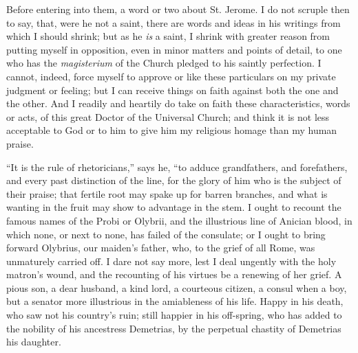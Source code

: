 Before entering into them, a word or two about St. Jerome. I do not
scruple then to say, that, were he not a saint, there are words and
ideas in his writings from which I should shrink; but as he \emph{is}
a saint, I shrink with greater reason from putting myself in
opposition, even in minor matters and points of detail, to one who has
the \emph{magisterium} of the Church pledged to his saintly
perfection. I cannot, indeed, force myself to approve or like these
particulars on my private judgment or feeling; but I can receive
things on faith against both the one and the other. And I readily and
heartily do take on faith these characteristics, words or acts, of
this great Doctor of the Universal Church; and think it is not less
acceptable to God or to him to give him my religious homage than my
human praise.

``It is the rule of rhetoricians,'' says he, ``to
adduce grandfathers, and forefathers, and every past distinction of
the line, for the glory of him who is the subject of their praise;
that fertile root may spake up for barren branches, and what is
wanting in the fruit may show to advantage
in the stem. I ought to recount the famous names of the Probi or
Olybrii, and the illustrious line of Anician blood, in which none, or
next to none, has failed of the consulate; or I ought to bring forward
Olybrius, our maiden's father, who, to the grief of all Rome, was
unmaturely carried off. I dare not say more, lest I deal ungently with
the holy matron's wound, and the recounting of his virtues be a
renewing of her grief. A pious son, a dear husband, a kind lord, a
courteous citizen, a consul when a boy, but a senator more illustrious
in the amiableness of his life. Happy in his death, who saw not his
country's ruin; still happier in his off-spring, who has added to the
nobility of his ancestress Demetrias, by the perpetual chastity of
Demetrias his daughter.

